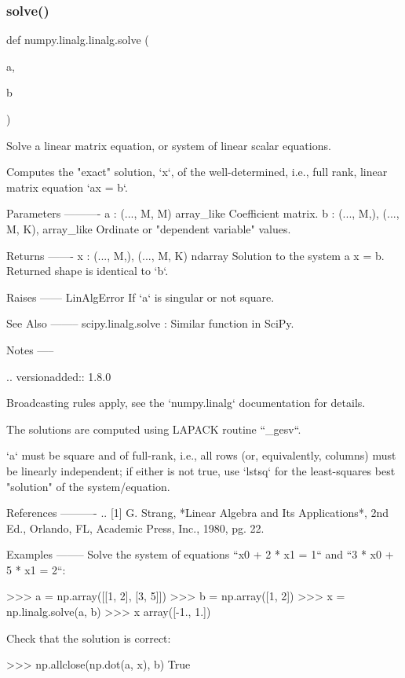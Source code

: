 \subsubsection{\texorpdfstring{solve()}{solve()}}
{\footnotesize\ttfamily def numpy.\+linalg.\+linalg.\+solve (\begin{DoxyParamCaption}\item[{}]{a,  }\item[{}]{b }\end{DoxyParamCaption})}

\begin{DoxyVerb}Solve a linear matrix equation, or system of linear scalar equations.

Computes the "exact" solution, `x`, of the well-determined, i.e., full
rank, linear matrix equation `ax = b`.

Parameters
----------
a : (..., M, M) array_like
    Coefficient matrix.
b : {(..., M,), (..., M, K)}, array_like
    Ordinate or "dependent variable" values.

Returns
-------
x : {(..., M,), (..., M, K)} ndarray
    Solution to the system a x = b.  Returned shape is identical to `b`.

Raises
------
LinAlgError
    If `a` is singular or not square.

See Also
--------
scipy.linalg.solve : Similar function in SciPy.

Notes
-----

.. versionadded:: 1.8.0

Broadcasting rules apply, see the `numpy.linalg` documentation for
details.

The solutions are computed using LAPACK routine ``_gesv``.

`a` must be square and of full-rank, i.e., all rows (or, equivalently,
columns) must be linearly independent; if either is not true, use
`lstsq` for the least-squares best "solution" of the
system/equation.

References
----------
.. [1] G. Strang, *Linear Algebra and Its Applications*, 2nd Ed., Orlando,
       FL, Academic Press, Inc., 1980, pg. 22.

Examples
--------
Solve the system of equations ``x0 + 2 * x1 = 1`` and ``3 * x0 + 5 * x1 = 2``:

>>> a = np.array([[1, 2], [3, 5]])
>>> b = np.array([1, 2])
>>> x = np.linalg.solve(a, b)
>>> x
array([-1.,  1.])

Check that the solution is correct:

>>> np.allclose(np.dot(a, x), b)
True\end{DoxyVerb}
 \mbox{\label{namespacenumpy_1_1linalg_1_1linalg_ad20d41a628c5e214b3a632bd99793e5e}} 
